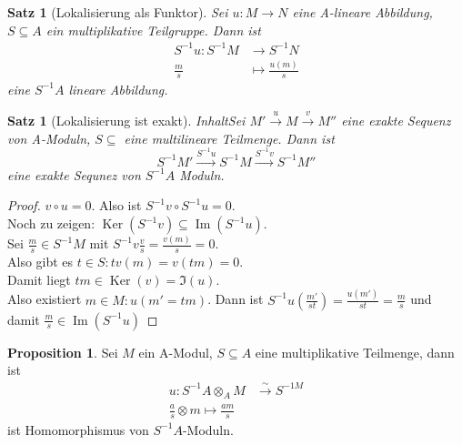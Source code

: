 \documentclass[10pt,a4paper]{article}
\newcommand{\isomfunc}{\ensuremath{\xrightarrow{\sim}}}
\newcommand{\Ker}{\ensuremath{\operatorname{Ker}}}
\newcommand{\Img}{\ensuremath{\operatorname{Im}}}
\newcounter{thm}[section]
\theoremstyle{definition}
\newtheorem{prop}[thm]{Proposition}
\theoremstyle{plain}
\newtheorem{satz}[thm]{Satz}
\theoremstyle{remark}
\begin{document}
\begin{satz}[Lokalisierung als Funktor]
	Sei $u:M\rightarrow  N$ eine A-lineare Abbildung, $S\subseteq A$ ein multiplikative Teilgruppe. Dann ist
	\begin{align*}
	S^{-1}u:S^{-1}M&\rightarrow S^{-1}N\\
	\frac{m}{s}&\mapsto \frac{u(m)}{s}
	\end{align*}
	eine $S^{-1}A$ lineare Abbildung.
\end{satz}
\begin{satz}[Lokalisierung ist exakt]
	InhaltSei $M'\xrightarrow{u}M\xrightarrow{v}M''$ eine exakte Sequenz von A-Moduln, $S\subseteq$ eine multilineare Teilmenge. Dann ist
	\[S^{-1}M'\xrightarrow{S^{-1}u}S^{-1}M\xrightarrow{S^{-1}v}S^{-1}M''\]
	eine exakte Sequnez von $S^{-1}A$ Moduln.
\end{satz}
\begin{proof}
	$v\circ u=0$. Also ist $S^{-1}v\circ S^{-1}u=0$.\\
	Noch zu zeigen: $\Ker(S^{-1}v)\subseteq \Img(S^{-1}u)$.\\
	Sei $\frac{m}{s}\in S^{-1}M$ mit $S^{-1}v\frac{v}{s}=\frac{v(m)}{s}=0$.\\
	Also gibt es $t\in S:tv(m)=v(tm)=0$.\\
	Damit liegt $tm\in\Ker(v)=\Im(u)$.\\
	Also existiert $m\in M:u(m'=tm)$.
	Dann ist $S^{-1}u\left(\frac{m'}{st}\right)=\frac{u(m')}{st}=\frac{m}{s}$ und damit $\frac{m}{s}\in\Img(S^{-1}u)$
\end{proof}
\begin{prop}
	Sei $M$ ein A-Modul, $S\subseteq A$ eine multiplikative Teilmenge, dann ist
	\begin{align*}
	u:S^{-1}A\otimes_A M&\isomfunc S^{-1 M}\\
	\frac{a}{s}\otimes m\mapsto \frac{am}{s}
	\end{align*}
	ist Homomorphismus von $S^{-1}A$-Moduln.
\end{prop}
\end{document}
